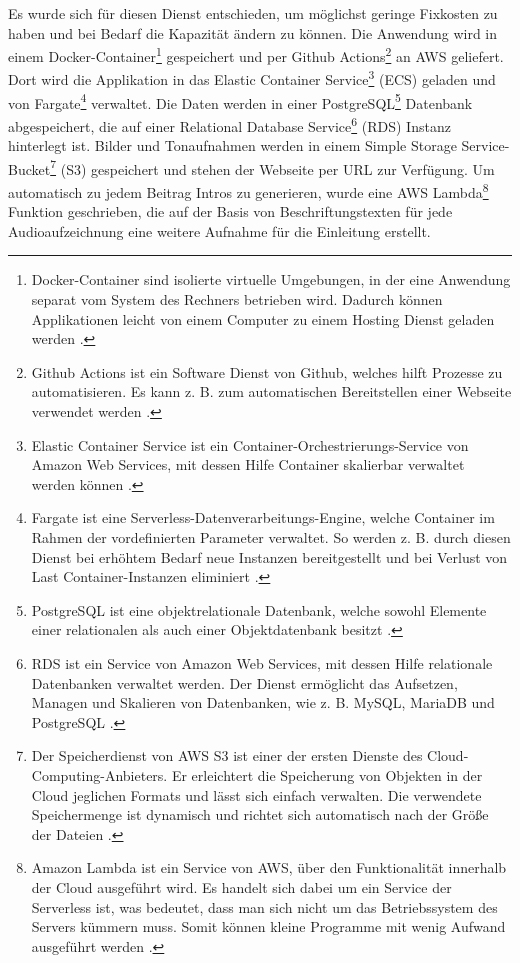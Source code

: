 	Es wurde sich für diesen Dienst entschieden, um möglichst geringe Fixkosten zu haben und bei Bedarf die Kapazität ändern zu können. Die Anwendung wird in einem Docker-Container\footnote{Docker-Container sind isolierte virtuelle Umgebungen, in der eine Anwendung separat vom System des Rechners betrieben wird. Dadurch können Applikationen leicht von einem Computer zu einem Hosting Dienst geladen werden \parencite{docker_container}.} gespeichert und per Github Actions\footnote{Github Actions ist ein Software Dienst von Github, welches hilft Prozesse zu automatisieren. Es kann z. B. zum automatischen Bereitstellen einer Webseite verwendet werden \parencite{github_actions}.} an AWS geliefert. Dort wird die Applikation in das Elastic Container Service\footnote{Elastic Container Service ist ein Container-Orchestrierungs-Service von Amazon Web Services, mit dessen Hilfe Container skalierbar verwaltet werden können \parencite{aws_ecs}.} (ECS) geladen und von Fargate\footnote{Fargate ist eine Serverless-Datenverarbeitungs-Engine, welche Container im Rahmen der vordefinierten Parameter verwaltet. So werden z. B. durch diesen Dienst bei erhöhtem Bedarf neue Instanzen bereitgestellt und bei Verlust von Last Container-Instanzen eliminiert \parencite{aws_fargate}.} verwaltet. 
	Die Daten werden in einer PostgreSQL\footnote{PostgreSQL ist eine objektrelationale Datenbank, welche sowohl Elemente einer relationalen als auch einer Objektdatenbank besitzt \parencite{postgresql}.} Datenbank abgespeichert, die auf einer Relational Database Service\footnote{RDS ist ein Service von Amazon Web Services, mit dessen Hilfe relationale Datenbanken verwaltet werden. Der Dienst ermöglicht das Aufsetzen, Managen und Skalieren von Datenbanken, wie z. B. MySQL, MariaDB und PostgreSQL \parencite[vlg.][S.161 f.]{baron_aws_2016}.} (RDS) Instanz hinterlegt ist. 
	Bilder und Tonaufnahmen werden in einem Simple Storage Service-Bucket\footnote{Der Speicherdienst von AWS S3 ist einer der ersten Dienste des Cloud-Computing-Anbieters. Er erleichtert die Speicherung von Objekten in der Cloud jeglichen Formats und lässt sich einfach verwalten. Die verwendete Speichermenge ist dynamisch und richtet sich automatisch nach der Größe der Dateien \parencite[vlg.][S. 23]{baron_aws_2016}.} (S3) gespeichert und stehen der Webseite per URL zur Verfügung. 
	Um automatisch zu jedem Beitrag Intros zu generieren, wurde eine AWS Lambda\footnote{Amazon Lambda ist ein Service von AWS, über den Funktionalität innerhalb der Cloud ausgeführt wird. Es handelt sich dabei um ein Service der Serverless ist, was bedeutet, dass man sich nicht um das Betriebssystem des Servers kümmern muss. Somit können kleine Programme mit wenig Aufwand ausgeführt werden \parencites[vlg.][Kap. 15.3]{wolff_microservices_2018}{aws_lambda}.} Funktion geschrieben, die auf der Basis von Beschriftungstexten für jede Audioaufzeichnung eine weitere Aufnahme für die Einleitung erstellt.

